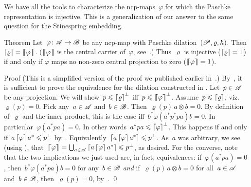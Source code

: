 \documentclass[b]{subfiles}
\begin{document}
\begin{parsec}%
\begin{point}%
We have all the tools to characterize
    the ncp-maps~$\varphi$
    for which the Paschke representation is injective.
This is a generalization of our answer\cite{stineinj}
    to the same question for the Stinespring embedding.
\end{point}
\begin{point}{Theorem}%
Let~$\varphi\colon \mathscr{A} \to \mathscr{B}$ be any ncp-map
    with Paschke dilation~$(\mathscr{P}, \varrho, h)$.
Then $\left\lceil\varrho\right\rceil = \left\lceil\!\!\left\lceil\varphi\right\rceil\!\!\right\rceil$.
($\left\lceil\!\!\left\lceil\varphi\right\rceil\!\!\right\rceil$ is the central carrier of~$\varphi$, see~.)
Thus~$\varrho$ is injective ($\left\lceil\varrho\right\rceil=1$) if and only if $\varphi$
maps no non-zero central projection to zero ($\left\lceil\!\!\left\lceil\varphi\right\rceil\!\!\right\rceil=1$).
\begin{point}{Proof}%
(This is a simplified version of the proof we published earlier
    in~\cite[Thm.~30]{paschke}.)
By~,
    it is sufficient to prove the equivalence
    for the dilation constructed in .
Let~$p \in \mathscr{A}$ be any projection.
We will show~$p \leqslant \left\lceil\varrho\right\rceil^\perp$ iff~$p \leqslant \left\lceil\!\!\left\lceil\varphi\right\rceil\!\!\right\rceil^\perp$.
Assume~$p \leqslant \left\lceil\varrho\right\rceil$,
    viz.~$\varrho(p) = 0$.
Pick any~$a \in \mathscr{A}$ and~$b\in \mathscr{B}$.
Then~$\varrho(p)\, a\otimes b = 0$.
By definition of~$\varrho$ and the inner product,
    this is the case iff~$b^* \varphi(a^*p^* pa) b = 0$.
In particular~$\varphi(a^* p a) = 0$.
In other words~$a^* p a \leqslant \left\lceil\varphi\right\rceil^\perp$.
This happens if and only if~$a \left\lceil\varphi\right\rceil a^* \leqslant p^\perp$
    by~.
Equivalently~$\left\lceil a \left\lceil\varphi\right\rceil a^*\right\rceil \leqslant p^\perp$.
As~$a$ was arbitrary,
    we see (using ),
    that~$\left\lceil\!\!\left\lceil\varphi\right\rceil\!\!\right\rceil = \bigcup_{a \in \mathscr{A}} \left\lceil a \left\lceil\varphi\right\rceil a^*\right\rceil
            \leqslant p^\perp$, as desired.
For the converse, note that
    the two implications we just used are, in fact, equivalences:
        if~$\varphi(a^* p a) =0$,
        then~$b^*\varphi(a^* pa) b = 0$ for any~$b \in \mathscr{B}$
        \emph{and} if~$\varrho(p)\, a \otimes b = 0$
        for all~$a \in \mathscr{A}$ and~$b\in \mathscr{B}$,
        then~$\varrho(p) = 0$, by~.
\qed
\end{point}
\end{point}
\end{parsec}
\end{document}
